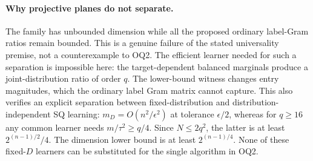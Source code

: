 \paragraph{Why projective planes do not separate.}
The family has unbounded dimension while all the proposed ordinary label-Gram ratios remain bounded. This is a genuine failure of the stated universality premise, not a counterexample to OQ2. The efficient learner needed for such a separation is impossible here: the target-dependent balanced marginals produce a joint-distribution ratio of order $q$. The lower-bound witness changes entry magnitudes, which the ordinary label Gram matrix cannot capture. This also verifies an explicit separation between fixed-distribution and distribution-independent SQ learning: $m_D=O(n^2/\epsilon^2)$ at tolerance $\epsilon/2$, whereas for $q\geq16$ any common learner needs $m/\tau^2\geq q/4$. Since $N\leq2q^2$, the latter is at least $2^{(n-1)/2}/4$. The dimension lower bound is at least $2^{(n-1)/4}$. None of these fixed-$D$ learners can be substituted for the single algorithm in OQ2.

